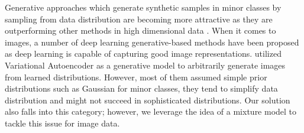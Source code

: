 Generative approaches which generate synthetic samples in minor classes by sampling from data distribution are becoming more attractive as they are outperforming other methods in high dimensional data \cite{DBLP:conf/dmin/LiuGM07}. When it comes to images, a number of deep learning generative-based methods have been proposed as deep learning is capable of capturing good image representations. \cite{rashid_convergence_2012} \cite{dai_generative_2019} \cite{mullick_generative_2019} utilized Variational Autoencoder as a generative model to arbitrarily generate images from learned distributions. However, most of them assumed simple prior distributions such as Gaussian for minor classes, they tend to simplify data distribution and might not succeed in sophisticated distributions. Our solution also falls into this category; however, we leverage the idea of a mixture model to tackle this issue for image data.     